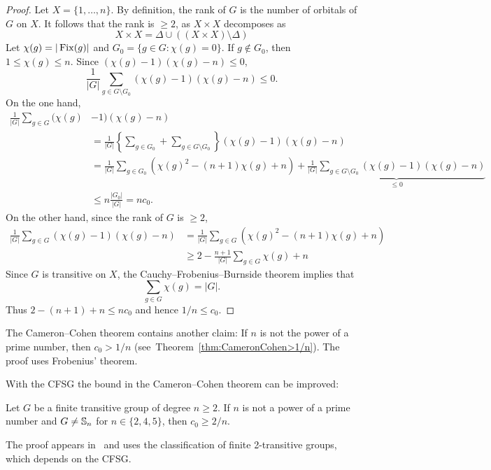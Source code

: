 \begin{proof}
    Let $X=\{1,\dots,n\}$. By definition, the rank of $G$ is the number
    of orbitals of $G$ on $X$. It follows that the rank is $\geq2$, as
    $X\times X$ decomposes as 
    \[
    X\times X=\Delta\cup\left((X\times X)\setminus\Delta\right)
    \]
    Let $\chi(g)=|\operatorname{Fix}(g)|$ and $G_0=\{g\in G:\chi(g)=0\}$. If $g\not\in G_0$, then $1\leq\chi(g)\leq n$. Since  
    $(\chi(g)-1)(\chi(g)-n)\leq 0$,
    \[
    \frac{1}{|G|}\sum_{g\in G\setminus G_0}(\chi(g)-1)(\chi(g)-n)\leq 0.
    \]
    On the one hand, 
    \begin{align*}
    \frac{1}{|G|}\sum_{g\in G}(\chi(g)&-1)(\chi(g)-n)\\
    &=\frac{1}{|G|}\left\{\sum_{g\in G_0}+\sum_{g\in G\setminus G_0}\right\}(\chi(g)-1)(\chi(g)-n)\\
    &=\frac{1}{|G|}\sum_{g\in G_0}(\chi(g)^2-(n+1)\chi(g)+n)
    +\underbrace{\frac{1}{|G|}\sum_{g\in G\setminus G_0}(\chi(g)-1)(\chi(g)-n)}_{\leq0}\\
    &\leq n\frac{|G_0|}{|G|}=nc_0.
    \end{align*}
    On the other hand, since the rank of $G$ is $\geq2$, 
    \begin{align*}
        \frac{1}{|G|}\sum_{g\in G}(\chi(g)-1)(\chi(g)-n)
        &=\frac{1}{|G|}\sum_{g\in G}(\chi(g)^2-(n+1)\chi(g)+n)\\
        &\geq 2-\frac{n+1}{|G|}\sum_{g\in G}\chi(g)+n
    \end{align*}
    Since $G$ is transitive on $X$, the Cauchy--Frobenius--Burnside theorem implies that
    \[
    \sum_{g\in G}\chi(g)=|G|.
    \]
    Thus $2-(n+1)+n\leq nc_0$ and hence
    $1/n\leq c_0$. 
\end{proof}

The Cameron--Cohen theorem contains another claim: If
$n$ is not the power of a prime number, then 
$c_0>1/n$ (see~Theorem~\ref{thm:CameronCohen>1/n}). The proof uses Frobenius' theorem. 

With the CFSG the bound in the 
Cameron--Cohen theorem can be improved:

\begin{theorem}
    Let $G$ be a finite transitive group of degree $n\geq2$. If $n$ 
    is not a power of a prime number and 
    $G\ne\mathbb{S}_n$ for $n\in\{2,4,5\}$, then $c_0\geq 2/n$.
\end{theorem}

The proof appears in~\cite{MR1484879} and uses
the classification of finite 2-transitive groups, 
which depends on the CFSG. 



